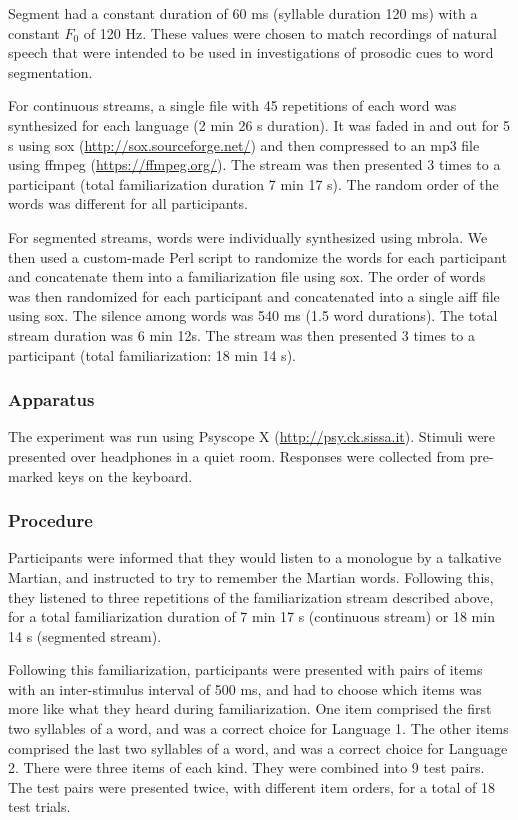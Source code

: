 \documentclass[
]{article}
\begin{document}
Segment had a constant duration of 60 ms (syllable duration 120 ms) with
a constant \(F_0\) of 120 Hz. These values were chosen to match
recordings of natural speech that were intended to be used in
investigations of prosodic cues to word segmentation.

For continuous streams, a single file with 45 repetitions of each word
was synthesized for each language (2 min 26 s duration). It was faded in
and out for 5 s using sox (\url{http://sox.sourceforge.net/}) and then
compressed to an mp3 file using ffmpeg (\url{https://ffmpeg.org/}). The
stream was then presented 3 times to a participant (total
familiarization duration 7 min 17 s). The random order of the words was
different for all participants.

For segmented streams, words were individually synthesized using mbrola.
We then used a custom-made Perl script to randomize the words for each
participant and concatenate them into a familiarization file using sox.
The order of words was then randomized for each participant and
concatenated into a single aiff file using sox. The silence among words
was 540 ms (1.5 word durations). The total stream duration was 6 min
12s. The stream was then presented 3 times to a participant (total
familiarization: 18 min 14 s).

\subsubsection{Apparatus}\label{apparatus}

The experiment was run using Psyscope X (\url{http://psy.ck.sissa.it}).
Stimuli were presented over headphones in a quiet room. Responses were
collected from pre-marked keys on the keyboard.

\subsubsection{Procedure}\label{procedure}

Participants were informed that they would listen to a monologue by a
talkative Martian, and instructed to try to remember the Martian words.
Following this, they listened to three repetitions of the
familiarization stream described above, for a total familiarization
duration of 7 min 17 s (continuous stream) or 18 min 14 s (segmented
stream).

Following this familiarization, participants were presented with pairs
of items with an inter-stimulus interval of 500 ms, and had to choose
which items was more like what they heard during familiarization. One
item comprised the first two syllables of a word, and was a correct
choice for Language 1. The other items comprised the last two syllables
of a word, and was a correct choice for Language 2. There were three
items of each kind. They were combined into 9 test pairs. The test pairs
were presented twice, with different item orders, for a total of 18 test
trials.
\end{document}
